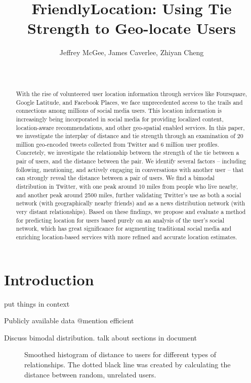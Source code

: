 \documentclass{sig-alternate}
\title{FriendlyLocation: Using Tie Strength to Geo-locate Users
}
\author{
    \alignauthor Jeffrey McGee, James Caverlee, Zhiyan Cheng\\
    \affaddr{Department of Computer Science and Engineering, Texas A\&M
    University} \\
    \affaddr{ College Station, TX 77845 USA} \\
    \email{jeffamcgee@tamu.edu, caverlee@cse.tamu.edu, chengzy@cse.tamu.edu}
}
\begin{document}
\maketitle
\begin{abstract}
With the rise of volunteered user location information through services like
Foursquare, Google Latitude, and Facebook Places, we face unprecedented access
to the trails and connections among millions of social media users. This
location information is increasingly being incorporated in social media for
providing localized content, location-aware recommendations, and other
geo-spatial enabled services. In this paper, we investigate the interplay of
distance and tie strength through an examination of 20 million geo-encoded
tweets collected from Twitter and 6 million user profiles. Concretely, we
investigate the relationship between the strength of the tie between a pair of
users, and the distance between the pair. We identify several factors --
including following, mentioning, and actively engaging in conversations with
another user -- that can strongly reveal the distance between a pair of users.
We find a bimodal distribution in Twitter, with one peak around 10 miles from
people who live nearby, and another peak around 2500 miles, further validating
Twitter's use as both a social network (with geographically nearby friends) and
as a news distribution network (with very distant relationships). Based on
these findings, we propose and evaluate a method for predicting location for
users based purely on an analysis of the user's social network, which has great
significance for augmenting traditional social media and enriching
location-based services with more refined and accurate location estimates.

\end{abstract}




\section{Introduction}

put things in context

Publicly available data
@mention
efficient


Discuss bimodal distribution.
talk about sections in document

\begin{figure}
\centering
{}
\caption{
Smoothed histogram of distance to users for different types of relationships.
The dotted black line was created by calculating the distance between random, unrelated users.
}
\label{fig:EdgeTypes}
\end{figure}
\end{document}
